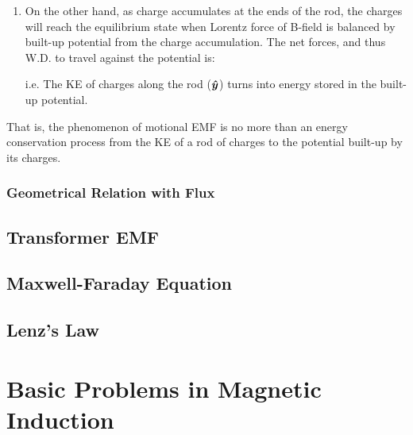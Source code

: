 \documentclass[class=article, crop=false, 12pt]{standalone}
\begin{document}
\begin{enumerate}

    \item On the other hand, as charge accumulates at the ends of the rod,
    the charges will reach the equilibrium state when 
    Lorentz force of B-field is balanced by built-up potential from the charge accumulation. 
    The net forces, and thus W.D. to travel against the potential is:
    

    i.e. The KE of charges along the rod ($\vu*{y}$) turns into energy stored in the built-up potential.

    
\end{enumerate}

That is, the phenomenon of motional EMF is no more than an energy conservation process from
the KE of a rod of charges to the potential built-up by its charges.





\subsubsection{Geometrical Relation with Flux}


\subsection{Transformer EMF}

\subsection{Maxwell-Faraday Equation}

\subsection{Lenz's Law}


\linesep
\section{Basic Problems in Magnetic Induction}


\theend
\end{document}
